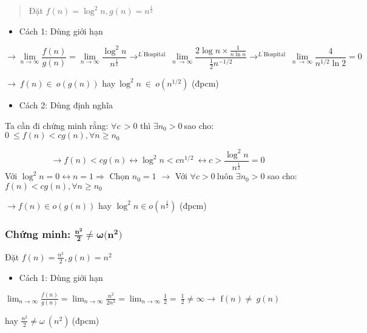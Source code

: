 \begin{quote}
Đặt \(f(n) = \log^2 n ,g(n) = n^{\frac{1}{2}}\) 
\end{quote}

\begin{itemize}
\item
  Cách 1: Dùng giới hạn
\end{itemize}
\[\rightarrow \lim_{n \rightarrow \infty}\frac{f(n)}{g(n)} = \lim_{n \rightarrow \infty}\frac{\log^2 n}{n^{\frac{1}{2}}} \rightarrow^{L^{'}\text{Hospital}}\ \lim_{n\  \rightarrow \infty}{\frac{2\log n\times \frac{1}{n\ln n}}{\frac{1}{2}n^{- 1\text{/}2}} \rightarrow^{L^{'}\text{Hospital}}}\ \lim_{n\  \rightarrow \infty}\frac{4}{n^{1/2}\ln 2} = 0\ \]

\(\rightarrow \ f(n) \in \ o(g(n))\)
hay\(\ \log^2 n\  \in \ o(n^{1/2})\) (đpcm)

\begin{itemize}
\item
  Cách 2: Dùng định nghĩa
\end{itemize}

Ta cần đi chứng minh rằng: \(\forall c\, > 0\) thì
\(\exists n_{0} > 0\ \)sao cho:
\(0\  \leq f(n) < cg(n),\forall n \geq n_{0}\)

\[\rightarrow f(n) < cg(n) \leftrightarrow {\log^2 n  < cn^{1/2}}\ \leftrightarrow c > \frac{\log^2 n}{n^\frac{1}{2}} = 0 \]
Với \(\log^2 n = 0 \leftrightarrow n = 1 \Rightarrow\) Chọn $n_0 = 1$ \(\rightarrow \) Với \(\forall c > 0\ \)luôn \(\exists n_{0} > 0\) sao cho: \(f(n) < cg(n),\forall n \geq n_{0}\)

\(\rightarrow f(n) \in o\left(g(n)\right)\) hay \(\log^2 n \in o\left(n^\frac{1}{2}\right)\) (đpcm)
\subsubsection{  \textbf{Chứng minh:}
  \(\frac{\mathbf{n}^{\mathbf{2}}}{\mathbf{2}}\mathbf{\neq \omega(}\mathbf{n}^{\mathbf{2}}\mathbf{)}\)}

Đặt \(f(n) = \frac{n^{2}}{2},g(n) = n^{2}\)

\begin{itemize}
\item
  Cách 1: Dùng giới hạn
\end{itemize}

\(\lim_{n \rightarrow \infty}\frac{f(n)}{g(n)} = \lim_{n \rightarrow \infty}\frac{n^{2}}{2n^{2}} = \lim_{n \rightarrow \infty}\frac{1}{2} = \ \frac{1}{2} \neq \infty \rightarrow \text{\ f}(n) \neq \ g(n)\)\par
hay \(\frac{n^{2}}{2} \neq \omega\ (n^{2})\ \)(đpcm)

